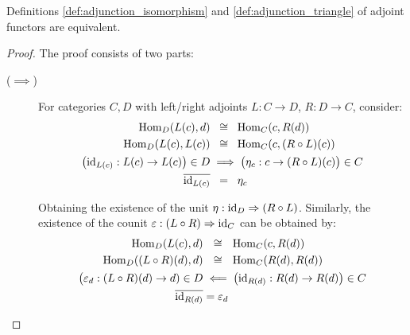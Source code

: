 \begin{theorem}
  Definitions \ref{def:adjunction_isomorphism} and \ref{def:adjunction_triangle}
  of adjoint functors are equivalent.

  \begin{proof}
    The proof consists of two parts:
    \begin{description}
      \item[($\implies$)] For categories $C,D$ with left/right adjoints $L:C\to
        D$, $R:D\to C$, consider:
        \[
          \begin{aligned}
            \mathrm{Hom}_D(L(c), d) &\ \:\cong\ \: \mathrm{Hom}_C(c, R(d))\\
            \mathrm{Hom}_D(L(c), L(c)) &\ \:\cong\ \: \mathrm{Hom}_C(c, (R\circ L)(c))\\
            \big(\mathrm{id}_{L(c)}: L(c) \to L(c)\big) \in D
            &\implies \big(\eta_c : c \to (R\circ L)(c)\big)\in C\\
            \overline{\mathrm{id}_{L(c)}} &\ \:=\ \:\eta_c
          \end{aligned}
        \]

        Obtaining the existence of the unit $\eta:\mathrm{id}_D\Rightarrow (R\circ L)$.
        Similarly, the existence of the counit $\varepsilon:(L\circ
        R)\Rightarrow\mathrm{id}_C$ can be obtained by:
        \[
          \begin{aligned}
            \mathrm{Hom}_D(L(c), d) &\ \ \cong\ \ \mathrm{Hom}_C(c, R(d))\\
            \mathrm{Hom}_D((L\circ R)(d), d) &\ \ \cong\ \ \mathrm{Hom}_C(R(d), R(d))\\
            \big(\varepsilon_{d} : (L\circ R)(d) \to d) \in D
            &\impliedby \big(\mathrm{id}_{R(d)}: R(d) \to R(d)\big) \in C\\
            \overline{\mathrm{id}_{R(d)}} &= \varepsilon_d
          \end{aligned}
        \]


\end{description}
\end{proof}
\end{theorem}
